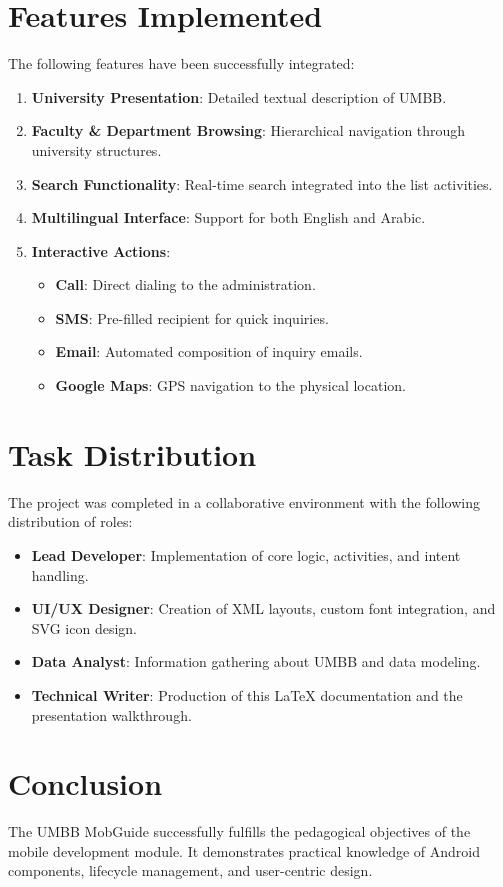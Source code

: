 \documentclass[12pt,a4paper]{article}
\begin{document}
\section{Features Implemented}
The following features have been successfully integrated:
\begin{enumerate}
    \item \textbf{University Presentation}: Detailed textual description of UMBB.
    \item \textbf{Faculty \& Department Browsing}: Hierarchical navigation through university structures.
    \item \textbf{Search Functionality}: Real-time search integrated into the list activities.
    \item \textbf{Multilingual Interface}: Support for both English and Arabic.
    \item \textbf{Interactive Actions}:
    \begin{itemize}
        \item \textbf{Call}: Direct dialing to the administration.
        \item \textbf{SMS}: Pre-filled recipient for quick inquiries.
        \item \textbf{Email}: Automated composition of inquiry emails.
        \item \textbf{Google Maps}: GPS navigation to the physical location.
    \end{itemize}
\end{enumerate}

\section{Task Distribution}
The project was completed in a collaborative environment with the following distribution of roles:
\begin{itemize}
    \item \textbf{Lead Developer}: Implementation of core logic, activities, and intent handling.
    \item \textbf{UI/UX Designer}: Creation of XML layouts, custom font integration, and SVG icon design.
    \item \textbf{Data Analyst}: Information gathering about UMBB and data modeling.
    \item \textbf{Technical Writer}: Production of this LaTeX documentation and the presentation walkthrough.
\end{itemize}

\section{Conclusion}
The UMBB MobGuide successfully fulfills the pedagogical objectives of the mobile development module. It demonstrates practical knowledge of Android components, lifecycle management, and user-centric design.
\end{document}
